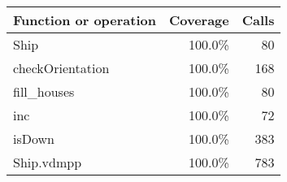 \bigskip
\begin{longtable}{|l|r|r|}
\hline
Function or operation & Coverage & Calls \\
\hline
\hline
Ship & 100.0\% & 80 \\
\hline
checkOrientation & 100.0\% & 168 \\
\hline
fill\_houses & 100.0\% & 80 \\
\hline
inc & 100.0\% & 72 \\
\hline
isDown & 100.0\% & 383 \\
\hline
\hline
Ship.vdmpp & 100.0\% & 783 \\
\hline
\end{longtable}

